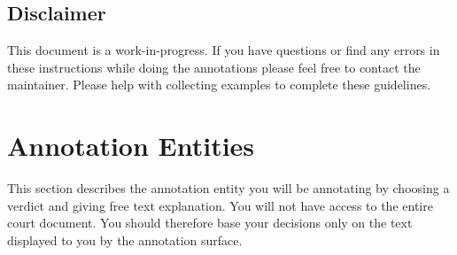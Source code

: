 \documentclass{article}
\begin{document}
\subsection{Disclaimer}
This document is a work-in-progress. If you have questions or find any errors in these instructions while doing the annotations please feel free to contact the maintainer. Please help with collecting examples to complete these guidelines.

\section{Annotation Entities}
This section describes the annotation entity you will be annotating by choosing a verdict and giving free text explanation. You will not have access to the entire court document. You should therefore base your decisions only on the text displayed to you by the annotation surface.
\end{document}
